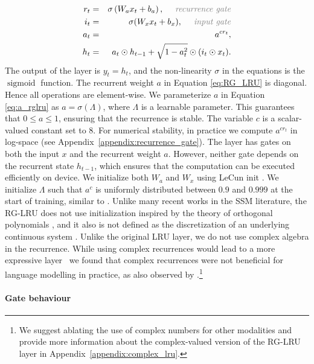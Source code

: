 \documentclass[11pt, a4paper, logo, onecolumn]{googledeepmind}
\DeclareMathOperator{\sigmoid}{sigmoid}
\theoremstyle{definition}
\begin{document}
\begin{eqnarray}
 r_t &=& \sigma\left(W_a x_t + b_a\right), \quad \textcolor{gray}{\text{ \emph{recurrence gate}}} \label{eq:recurrent_gate} \\
 i_t & = & \sigma(W_x x_t + b_x), \quad \textcolor{gray}{\text{\emph{ input gate}}} \label{eq:input_gate}\\
a_t &=& a^{c r_t}, \label{eq:a_rglru} \\
h_{t} &=& a_t \odot h_{t-1} + \sqrt{1-a_t^2} \odot (i_t \odot x_t).
\label{eq:RG_LRU}
\end{eqnarray}
The output of the layer is $y_t = h_t$, and the non-linearity $\sigma$ in the equations is the $\sigmoid$ function. 
The recurrent weight $a$ in Equation \eqref{eq:RG_LRU} is diagonal. Hence all operations are element-wise.
We parameterize $a$ in Equation \eqref{eq:a_rglru} as $a = \sigma(\Lambda)$, where $\Lambda$ is a learnable parameter.
This guarantees that $0 \leq a \leq 1$, ensuring that the recurrence is stable.
The variable $c$ is a scalar-valued constant set to $8$.
For numerical stability, in practice we compute $a^{cr_t}$ in log-space (see Appendix~\ref{appendix:recurrence_gate}).
The layer has gates on both the input $x$ and the recurrent weight $a$. However, neither gate depends on the recurrent state $h_{t-1}$, which ensures that the computation can be executed efficiently on device. 
We initialize both $W_a$ and $W_x$ using LeCun init \citep{lecun2002efficient}. 
We initialize $\Lambda$ such that $a^c$ is uniformly distributed between $0.9$ and $0.999$ at the start of training, similar to \cite{orvieto2023resurrecting}. 
Unlike many recent works in the SSM literature, the RG-LRU does not use initialization inspired by the theory of orthogonal polynomials \citep{gu2020hippo}, and it also is not defined as the discretization of an underlying continuous system \citep{gu2021efficiently}. 
Unlike the original LRU layer, we do not use complex algebra in the recurrence. While using complex recurrences would lead to a more expressive layer~\citep{orvieto2023universality} we found that complex recurrences were not beneficial for language modelling in practice, as also observed by \citet{gu2023mamba}.\footnote{We suggest ablating the use of complex numbers for other modalities and provide more information about the complex-valued version of the RG-LRU layer in Appendix~\ref{appendix:complex_lru}.} %




\paragraph{Gate behaviour}
\end{document}
